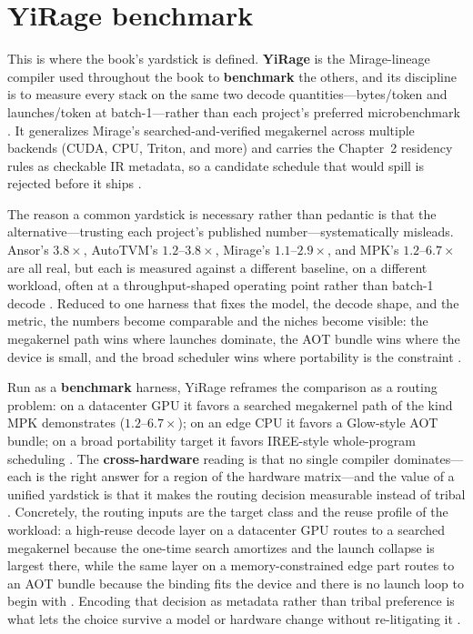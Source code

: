\section{YiRage benchmark}
\label{sec:ch21_yirage_benchmark}

This is where the book's yardstick is defined. \textbf{YiRage} is the Mirage-lineage compiler used throughout the book to \textbf{benchmark} the others, and its discipline is to measure every stack on the same two decode quantities---bytes/token and launches/token at batch-1---rather than each project's preferred microbenchmark \citep{yirage2026,taxbreak2026}. It generalizes Mirage's searched-and-verified megakernel across multiple backends (CUDA, CPU, Triton, and more) and carries the Chapter~2 residency rules as checkable IR metadata, so a candidate schedule that would spill is rejected before it ships \citep{yirage2026,wu2024mirage}.

The reason a common yardstick is necessary rather than pedantic is that the alternative---trusting each project's published number---systematically misleads. Ansor's $3.8\times$, AutoTVM's $1.2$--$3.8\times$, Mirage's $1.1$--$2.9\times$, and MPK's $1.2$--$6.7\times$ are all real, but each is measured against a different baseline, on a different workload, often at a throughput-shaped operating point rather than batch-1 decode \citep{zheng2020ansor,chen2018autotvm,wu2024mirage,mpk2025}. Reduced to one harness that fixes the model, the decode shape, and the metric, the numbers become comparable and the niches become visible: the megakernel path wins where launches dominate, the AOT bundle wins where the device is small, and the broad scheduler wins where portability is the constraint \citep{taxbreak2026,memoryfloor2026}.

Run as a \textbf{benchmark} harness, YiRage reframes the comparison as a routing problem: on a datacenter GPU it favors a searched megakernel path of the kind MPK demonstrates ($1.2$--$6.7\times$); on an edge CPU it favors a Glow-style AOT bundle; on a broad portability target it favors IREE-style whole-program scheduling \citep{mpk2025,rotem2018glow,iree2024}. The \textbf{cross-hardware} reading is that no single compiler dominates---each is the right answer for a region of the hardware matrix---and the value of a unified yardstick is that it makes the routing decision measurable instead of tribal \citep{patel2025llminference,memoryfloor2026}. Concretely, the routing inputs are the target class and the reuse profile of the workload: a high-reuse decode layer on a datacenter GPU routes to a searched megakernel because the one-time search amortizes and the launch collapse is largest there, while the same layer on a memory-constrained edge part routes to an AOT bundle because the binding fits the device and there is no launch loop to begin with \citep{mpk2025,rotem2018glow}. Encoding that decision as metadata rather than tribal preference is what lets the choice survive a model or hardware change without re-litigating it \citep{yirage2026}.

